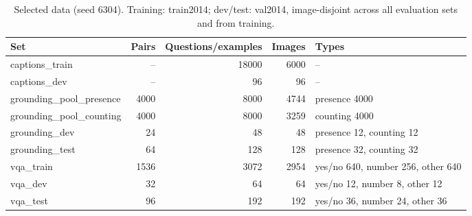\begin{table}[t]
\centering
\small
\caption{Selected data (seed 6304). Training: train2014; dev/test: val2014, image-disjoint across all evaluation sets and from training.}
\label{tab:t2_t1_data}
\begin{tabular}{lrrrl}
\toprule
Set & Pairs & Questions/examples & Images & Types \\
\midrule
captions\_train & -- & 18000 & 6000 & -- \\
captions\_dev & -- & 96 & 96 & -- \\
grounding\_pool\_presence & 4000 & 8000 & 4744 & presence 4000 \\
grounding\_pool\_counting & 4000 & 8000 & 3259 & counting 4000 \\
grounding\_dev & 24 & 48 & 48 & presence 12, counting 12 \\
grounding\_test & 64 & 128 & 128 & presence 32, counting 32 \\
vqa\_train & 1536 & 3072 & 2954 & yes/no 640, number 256, other 640 \\
vqa\_dev & 32 & 64 & 64 & yes/no 12, number 8, other 12 \\
vqa\_test & 96 & 192 & 192 & yes/no 36, number 24, other 36 \\
\bottomrule
\end{tabular}
\end{table}
